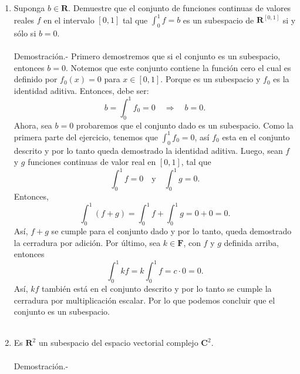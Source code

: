 \begin{enumerate}[\bfseries 1.]
    \item Suponga $b\in \textbf{R}$. Demuestre que el conjunto de funciones continuas de valores reales $f$ en el intervalo $[0,1]$ tal que $\int_0^1 f = b$ es un subespacio de $\textbf{R}^{[0,1]}$ si y sólo si $b=0$.\\\\
	Demostración.-\; Primero demostremos que si el conjunto es un subespacio, entonces $b=0$. Notemos que este conjunto contiene la función cero el cual es definido por $f_0(x)=0$ para $x\in[0,1]$. Porque es un subespacio y $f_0$ es la identidad aditiva. Entonces, debe ser:
	$$b=\int_0^1 f_0=0\quad \Rightarrow \quad b=0.$$
	Ahora, sea $b=0$ probaremos que el conjunto dado es un subespacio. Como la primera parte del ejercicio, tenemos que $\int_0^1 f_0=0$, así $f_0$ esta en el conjunto descrito y por lo tanto queda demostrado la identidad aditiva. Luego, sean $f$ y $g$ funciones continuas de valor real en $[0,1]$, tal que 
	$$\int_0^1 f=0\quad \mbox{y}\quad \int_0^1 g = 0.$$
	Entonces,
	$$\int_0^1 (f+g)=\int_0^1 f + \int_0^1 g = 0+0=0.$$
	Así, $f+g$ se cumple para el conjunto dado y por lo tanto, queda demostrado la cerradura por adición. Por último, sea $k\in \textbf{F}$, con $f$ y $g$ definida arriba, entonces
	$$\int_0^1 kf = k\int_0^1 f = c\cdot 0 = 0.$$
	Así, $kf$ también está en el conjunto descrito y por lo tanto se cumple la cerradura por multiplicación escalar. Por lo que podemos concluir que el conjunto es un subespacio.\\\\

    \item Es $\textbf{R}^2$ un subespacio del espacio vectorial complejo $\textbf{C}^2$.\\\\
	Demostración.-\;

\end{enumerate}


